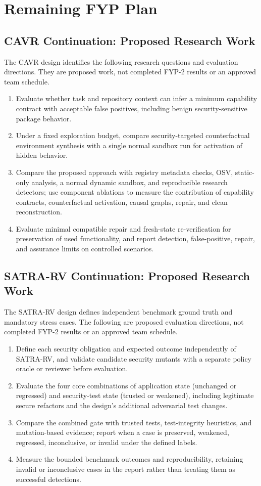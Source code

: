 \chapter{Remaining FYP Plan}\label{chap:fyp2-plan}
\section{CAVR Continuation: Proposed Research Work}
The CAVR design identifies the following research questions and evaluation directions. They are proposed work, not completed FYP-2 results or an approved team schedule.
\begin{enumerate}
    \item Evaluate whether task and repository context can infer a minimum capability contract with acceptable false positives, including benign security-sensitive package behavior.
    \item Under a fixed exploration budget, compare security-targeted counterfactual environment synthesis with a single normal sandbox run for activation of hidden behavior.
    \item Compare the proposed approach with registry metadata checks, OSV, static-only analysis, a normal dynamic sandbox, and reproducible research detectors; use component ablations to measure the contribution of capability contracts, counterfactual activation, causal graphs, repair, and clean reconstruction.
    \item Evaluate minimal compatible repair and fresh-state re-verification for preservation of used functionality, and report detection, false-positive, repair, and assurance limits on controlled scenarios.
\end{enumerate}

\clearpage
\section{SATRA-RV Continuation: Proposed Research Work}
The SATRA-RV design defines independent benchmark ground truth and mandatory stress cases. The following are proposed evaluation directions, not completed FYP-2 results or an approved team schedule.
\begin{enumerate}
    \item Define each security obligation and expected outcome independently of SATRA-RV, and validate candidate security mutants with a separate policy oracle or reviewer before evaluation.
    \item Evaluate the four core combinations of application state (unchanged or regressed) and security-test state (trusted or weakened), including legitimate secure refactors and the design's additional adversarial test changes.
    \item Compare the combined gate with trusted tests, test-integrity heuristics, and mutation-based evidence; report when a case is preserved, weakened, regressed, inconclusive, or invalid under the defined labels.
    \item Measure the bounded benchmark outcomes and reproducibility, retaining invalid or inconclusive cases in the report rather than treating them as successful detections.
\end{enumerate}

